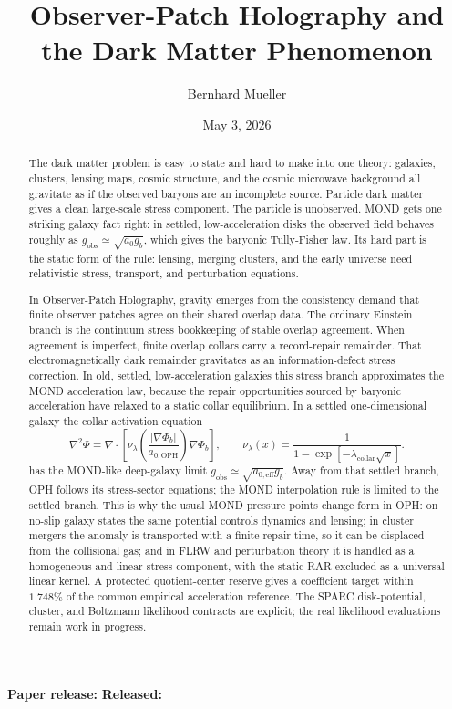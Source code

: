 \documentclass[11pt]{article}
\title{Observer-Patch Holography and the Dark Matter Phenomenon}
\author{Bernhard Mueller}
\date{May 3, 2026}
\begin{document}
\maketitle
\begin{center}
\small\textbf{Paper release:} \OPHPaperReleaseID\quad
\textbf{Released:} \OPHPaperReleaseDate
\end{center}

\begin{abstract}
The dark matter problem is easy to state and hard to make into one theory:
galaxies, clusters, lensing maps, cosmic structure, and the cosmic microwave
background all gravitate as if the observed baryons are an incomplete source.
Particle dark matter gives a clean large-scale stress component. The
particle is unobserved. MOND gets one striking galaxy fact right: in
settled, low-acceleration disks the observed field behaves roughly as
\(g_{\mathrm{obs}}\simeq\sqrt{a_0 g_b}\), which gives the baryonic
Tully-Fisher law. Its hard part is the static form of the rule: lensing, merging clusters, and
the early universe need relativistic stress, transport, and perturbation
equations.

In Observer-Patch Holography, gravity emerges from the consistency demand that
finite observer patches agree on their shared overlap data. The ordinary
Einstein branch is the continuum stress bookkeeping of stable overlap
agreement. When agreement is imperfect, finite overlap collars carry a
record-repair remainder. That electromagnetically dark remainder gravitates as an
information-defect stress correction. In old, settled,
low-acceleration galaxies this stress branch approximates the MOND
acceleration law, because the repair opportunities sourced by baryonic
acceleration have relaxed to a static collar equilibrium. In a settled
one-dimensional galaxy the collar activation equation
\[
\nabla^2\Phi
 =
 \nabla\cdot
 \left[
   \nu_\lambda\!\left(\frac{|\nabla\Phi_b|}{a_{0,\mathrm{OPH}}}\right)
   \nabla\Phi_b
 \right],
 \qquad
 \nu_\lambda(x)=
 \frac{1}{1-\exp[-\lambda_{\mathrm{collar}}\sqrt{x}]} .
\]
has the MOND-like deep-galaxy limit
\(g_{\mathrm{obs}}\simeq\sqrt{a_{0,\mathrm{eff}}g_b}\). Away from that
settled branch, OPH follows its stress-sector equations; the MOND interpolation
rule is limited to the settled branch. This is why the usual MOND pressure points change
form in OPH: on no-slip galaxy states the same potential controls
dynamics and lensing; in cluster mergers the anomaly is transported with a
finite repair time, so it can be displaced from the collisional gas; and in
FLRW and perturbation theory it is handled as a homogeneous and linear stress
component, with the static RAR excluded as a universal linear kernel. A protected
quotient-center reserve gives a coefficient target within \(1.748\%\) of the
common empirical acceleration reference. The SPARC disk-potential, cluster,
and Boltzmann likelihood
contracts are explicit; the real likelihood evaluations remain work in
progress.
\end{abstract}
\end{document}
